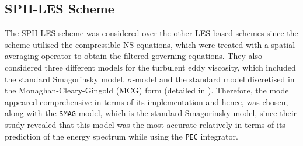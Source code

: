\subsection{SPH-LES Scheme}
The SPH-LES scheme was considered over the other LES-based schemes since the scheme utilised the compressible NS equations, which were treated with a spatial averaging operator to obtain the filtered governing equations. They also considered three different models for the turbulent eddy viscosity, which included the standard Smagorinsky model, $\sigma$-model and the standard model discretised in the Monaghan-Cleary-Gingold (MCG) form (detailed in ). Therefore, the model appeared comprehensive in terms of its implementation and hence, was chosen, along with the \texttt{SMAG} model, which is the standard Smagorinsky model, since their study revealed that this model was the most accurate relatively in terms of its prediction of the energy spectrum while using the \texttt{PEC} integrator.

